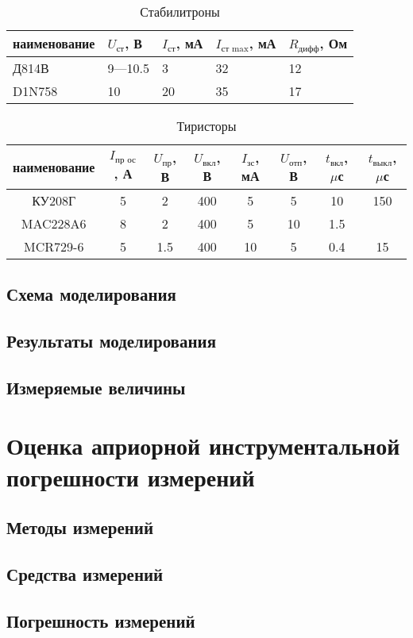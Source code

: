 \begin{table}[H]
\begin{center}
	\caption{Стабилитроны}
	\def\tabcolsep{10pt}
	\begin{tabular}{|l|l|l|l|l|}
		\hline
		наименование &
		$U_\text{ст}$, В &
		$I_\text{ст}$, мА &
		$I_\text{ст max}$, мА &
		$R_\text{дифф}$, Ом \\ 
		\hline
		Д814В &
		9---10.5 &
		3 &
		32 &
		12 \\
		\hline
		D1N758 &
		10 &
		20 &
		35 &
		17 \\
		\hline
\end{tabular}
\end{center}
\end{table}

\begin{table}[H]
\begin{center}
	\caption{Тиристоры}
	\def\tabcolsep{4pt}
	\begin{tabular}{|c|c|c|c|c|c|c|c|}
		\hline
		наименование &
		$I_\text{пр ос}$, А &
		$U_\text{пр}$, В &
		$U_\text{вкл}$, В &
		$I_\text{зс}$, мА &
		$U_\text{отп}$, В &
		$t_\text{вкл}$, $\mu$с &
		$t_\text{выкл}$, $\mu$с \\ 
		\hline
		КУ208Г &
		5 &
		2 &
		400 &
		5 &
		5 &
		10 &
		150 \\
		\hline
		MAC228A6 &
		8 &
		2 &
		400 &
		5 &
		10 &
		1.5 &
		\\
		\hline
		MCR729-6 &
		5 &
		1.5 &
		400 &
		10 &
		5 &
		0.4 &
		15 \\
		\hline
\end{tabular}
\end{center}
\end{table}

\subsection{Схема моделирования}

\subsection{Результаты моделирования}

\subsection{Измеряемые величины}

\section{Оценка априорной инструментальной погрешности измерений}

\subsection{Методы измерений}

\subsection{Средства измерений}

\subsection{Погрешность измерений}


